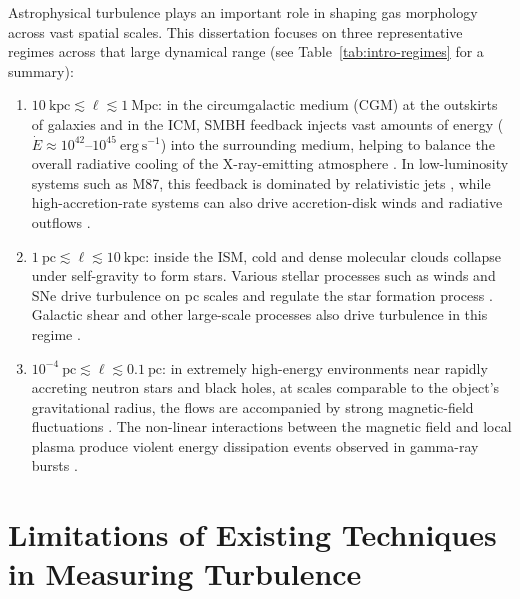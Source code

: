 Astrophysical turbulence plays an important role in shaping gas morphology across vast spatial scales.
This dissertation focuses on three representative regimes across that large dynamical range (see Table~\ref{tab:intro-regimes} for a summary):
\begin{enumerate}
    \item $10\ \mathrm{kpc} \lesssim \ell \lesssim 1\ \mathrm{Mpc}$: in the circumgalactic medium (CGM) at the outskirts of galaxies and in the ICM, SMBH feedback injects vast amounts of energy ($\dot{E} \approx 10^{42}\text{--}10^{45}\ \mathrm{erg\ s^{-1}}$) into the surrounding medium, helping to balance the overall radiative cooling of the X-ray-emitting atmosphere \citep{fabian_cooling_1994}. In low-luminosity systems such as M87, this feedback is dominated by relativistic jets \citep{fabian_observational_2012,li_direct_2020}, while high-accretion-rate systems can also drive accretion-disk winds and radiative outflows \citep[][]{murray_accretion_1995}.
    \item $1\ \mathrm{pc} \lesssim \ell \lesssim 10\ \mathrm{kpc}$: inside the ISM, cold and dense molecular clouds collapse under self-gravity to form stars.
    Various stellar processes such as winds and SNe drive turbulence on pc scales and regulate the star formation process \citep[][]{mac_low_control_2004,mckee_theory_2007,hennebelle_turbulent_2012}.
    Galactic shear and other large-scale processes also drive turbulence in this regime \citep[e.g.,][]{piontek_models_2007,forbes_gas_2023}.
    \item $10^{-4}\ \mathrm{pc} \lesssim \ell \lesssim 0.1\ \mathrm{pc}$: in extremely high-energy environments near rapidly accreting neutron stars and black holes, at scales comparable to the object's gravitational radius, the flows are accompanied by strong magnetic-field fluctuations \citep{biskamp_magnetohydrodynamic_2003, beresnyak_mhd_2019}.
    The non-linear interactions between the magnetic field and local plasma produce violent energy dissipation events observed in gamma-ray bursts \citep[e.g.,][]{beniamini_prompt_2017,lazarian_gamma-ray_2019}.
\end{enumerate}

\section{Limitations of Existing Techniques in Measuring Turbulence}

